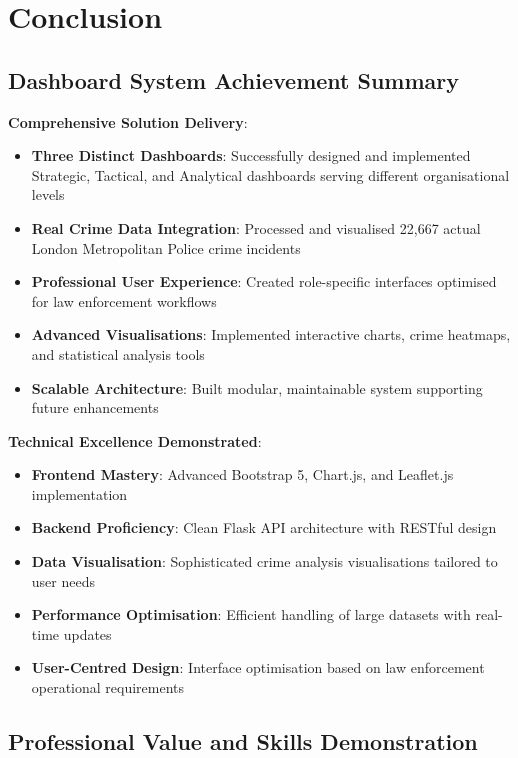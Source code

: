 \documentclass[12pt,a4paper]{article}
\begin{document}
\section{Conclusion}

\subsection{Dashboard System Achievement Summary}

\textbf{Comprehensive Solution Delivery}:
\begin{itemize}
    \item[\checkmark] \textbf{Three Distinct Dashboards}: Successfully designed and implemented Strategic, Tactical, and Analytical dashboards serving different organisational levels
    \item[\checkmark] \textbf{Real Crime Data Integration}: Processed and visualised 22,667 actual London Metropolitan Police crime incidents
    \item[\checkmark] \textbf{Professional User Experience}: Created role-specific interfaces optimised for law enforcement workflows
    \item[\checkmark] \textbf{Advanced Visualisations}: Implemented interactive charts, crime heatmaps, and statistical analysis tools
    \item[\checkmark] \textbf{Scalable Architecture}: Built modular, maintainable system supporting future enhancements
\end{itemize}

\textbf{Technical Excellence Demonstrated}:
\begin{itemize}
    \item \textbf{Frontend Mastery}: Advanced Bootstrap 5, Chart.js, and Leaflet.js implementation
    \item \textbf{Backend Proficiency}: Clean Flask API architecture with RESTful design
    \item \textbf{Data Visualisation}: Sophisticated crime analysis visualisations tailored to user needs
    \item \textbf{Performance Optimisation}: Efficient handling of large datasets with real-time updates
    \item \textbf{User-Centred Design}: Interface optimisation based on law enforcement operational requirements
\end{itemize}

\subsection{Professional Value and Skills Demonstration}
\end{document}
